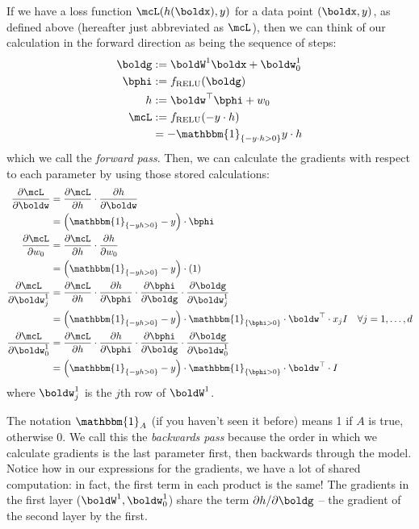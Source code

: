 \documentclass[12pt,letterpaper]{article}
\newcommand{\1}{\mathbbm{1}}
\begin{document}
If we have a loss function $\mcL(h(\boldx), y)$ for a data point $(\boldx, y)$, as defined above (hereafter just abbreviated as $\mcL$), then we can think of our calculation in the forward direction as being the sequence of steps:
\begin{align}
    \boldg &:= \boldW^1 \boldx + \boldw_0^1 \\
    \bphi &:= f_{\operatorname{RELU}}(\boldg)\\
    h &:= \boldw^\top \bphi + w_0 \\
    \mcL &:= f_{\operatorname{RELU}}(-y \cdot h) \\
    &= - \mathbbm{1}_{\{-y \cdot h > 0\}} y \cdot h
\end{align}
which we call the \emph{forward pass}. Then, we can calculate the gradients with respect to each parameter by using those stored calculations:
\begin{align}
    \frac{\partial \mcL}{\partial \boldw} &= \frac{\partial \mcL}{\partial h} \cdot \frac{\partial h}{\partial \boldw} \\
        &= \left(\mathbbm{1}_{\{-y h > 0\}} -y\right) \cdot \bphi \\
    \frac{\partial \mcL}{\partial w_0} &= \frac{\partial \mcL}{\partial h} \cdot \frac{\partial h}{\partial w_0} \\
        &= \left(\mathbbm{1}_{\{-y h > 0\}} -y\right) \cdot \left(1\right) \\
    \frac{\partial \mcL}{\partial \boldw_j^1} &= \frac{\partial \mcL}{\partial h} \cdot \frac{\partial h}{\partial \bphi} \cdot \frac{\partial \bphi}{\partial \boldg} \cdot \frac{\partial \boldg}{\partial \boldw_j^1} \\
        &= \left(\mathbbm{1}_{\{-y h > 0\}} -y \right) \cdot \mathbbm{1}_{\{\bphi > 0\}} \cdot  \boldw^\top \cdot x_jI \quad \forall j = 1,\ldots,d \\
    \frac{\partial \mcL}{\partial \boldw_0^1} &= \frac{\partial \mcL}{\partial h} \cdot \frac{\partial h}{\partial \bphi} \cdot \frac{\partial \bphi}{\partial \boldg} \cdot \frac{\partial \boldg}{\partial \boldw_0^1} \\
        &= \left(\mathbbm{1}_{\{-y h > 0\}} -y \right) \cdot \mathbbm{1}_{\{\bphi > 0\}} \cdot \boldw^\top \cdot I
\end{align}
where $\boldw_j^1$ is the $j$th row of $\boldW^1$.

The notation $\mathbbm{1}_{A}$ (if you haven't seen it before) means 1 if $A$ is true, otherwise 0. We call this the \emph{backwards pass} because the order in which we calculate gradients is the last parameter first, then backwards through the model. Notice how in our expressions for the gradients, we have a lot of shared computation: in fact, the first term in each product is the same! The gradients in the first layer ($\boldW^1, \boldw_0^1$) share the term $\partial h / \partial \boldg$ -- the gradient of the second layer by the first. 
\end{document}
